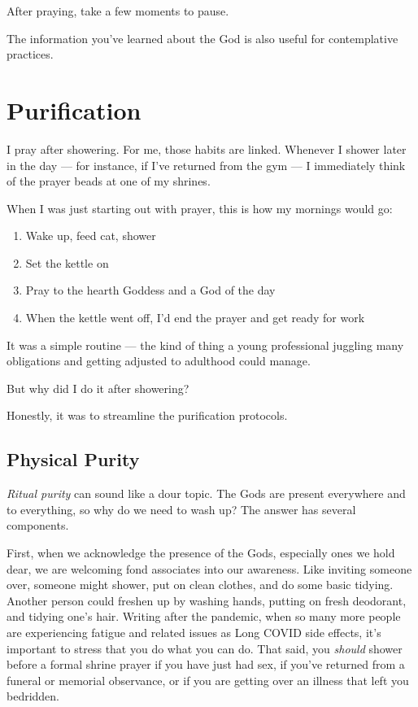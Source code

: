 \documentclass[
]{book}
\providecommand{\tightlist}{%
  \setlength{\itemsep}{0pt}\setlength{\parskip}{0pt}}
\begin{document}
After praying, take a few moments to pause.

The information you've learned about the God is also useful for contemplative practices.

\hypertarget{purification}{%
\chapter{Purification}\label{purification}}

I pray after showering. For me, those habits are linked. Whenever I shower later in the day --- for instance, if I've returned from the gym --- I immediately think of the prayer beads at one of my shrines.

When I was just starting out with prayer, this is how my mornings would go:

\begin{enumerate}
\def\labelenumi{\arabic{enumi}.}
\tightlist
\item
  Wake up, feed cat, shower
\item
  Set the kettle on
\item
  Pray to the hearth Goddess and a God of the day
\item
  When the kettle went off, I'd end the prayer and get ready for work
\end{enumerate}

It was a simple routine --- the kind of thing a young professional juggling many obligations and getting adjusted to adulthood could manage.

But why did I do it after showering?

Honestly, it was to streamline the purification protocols.

\hypertarget{physical-purity}{%
\section{Physical Purity}\label{physical-purity}}

\emph{Ritual purity} can sound like a dour topic. The Gods are present everywhere and to everything, so why do we need to wash up? The answer has several components.

First, when we acknowledge the presence of the Gods, especially ones we hold dear, we are welcoming fond associates into our awareness. Like inviting someone over, someone might shower, put on clean clothes, and do some basic tidying. Another person could freshen up by washing hands, putting on fresh deodorant, and tidying one's hair. Writing after the pandemic, when so many more people are experiencing fatigue and related issues as Long COVID side effects, it's important to stress that you do what you can do. That said, you \emph{should} shower before a formal shrine prayer if you have just had sex, if you've returned from a funeral or memorial observance, or if you are getting over an illness that left you bedridden.
\end{document}

